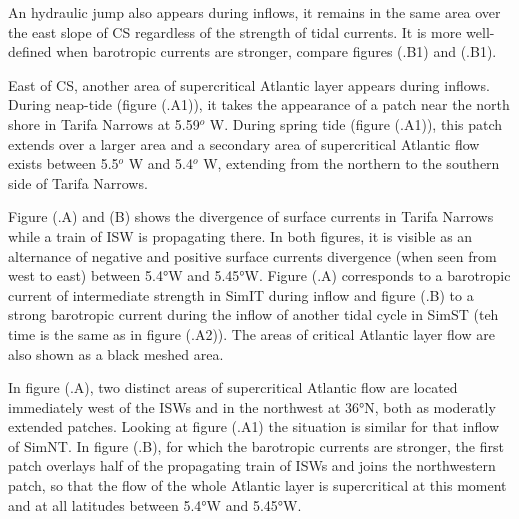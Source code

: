 An hydraulic jump also appears during inflows, it remains in the same area over the east slope of CS regardless of the strength of tidal currents. It is more well-defined when barotropic currents are stronger, compare figures (.B1) and (.B1).

East of CS, another area of supercritical Atlantic layer appears during inflows. During neap-tide (figure (.A1)), it takes the appearance of a patch near the north shore in Tarifa Narrows at 5.59$^o$ W. During spring tide (figure (.A1)), this patch extends over a larger area and a secondary area of supercritical Atlantic flow exists between 5.5$^o$ W and 5.4$^o$ W, extending from the northern to the southern side of Tarifa Narrows. 

Figure (.A) and (B) shows the divergence of surface currents in Tarifa Narrows while a train of ISW is propagating there. In both figures, it is visible as an alternance of negative and positive surface currents divergence (when seen from west to east) between 5.4°W and 5.45°W. Figure (.A) corresponds to a barotropic current of intermediate strength in SimIT during inflow and figure (.B) to a strong barotropic current during the inflow of another tidal cycle in SimST (teh time is the same as in figure (.A2)). The areas of critical Atlantic layer flow are also shown as a black meshed area. 

In figure (.A), two distinct areas of supercritical Atlantic flow are located immediately west of the ISWs and in the northwest at 36°N, both as moderatly extended patches. Looking at figure (.A1) the situation is similar for that inflow of SimNT. In figure (.B), for which the barotropic currents are stronger, the first patch overlays half of the propagating train of ISWs and joins the northwestern patch, so that the flow of the whole Atlantic layer is supercritical at this moment and at all latitudes between 5.4°W and 5.45°W.


